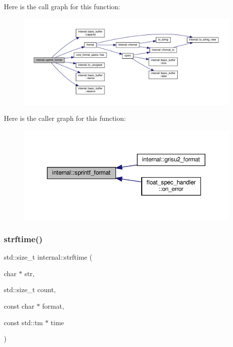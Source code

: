 Here is the call graph for this function\+:
\nopagebreak
\begin{figure}[H]
\begin{center}
\leavevmode
\includegraphics[width=350pt]{namespaceinternal_a13d861df4fe01615dc7cb28d77e839e4_cgraph}
\end{center}
\end{figure}
Here is the caller graph for this function\+:
\nopagebreak
\begin{figure}[H]
\begin{center}
\leavevmode
\includegraphics[width=343pt]{namespaceinternal_a13d861df4fe01615dc7cb28d77e839e4_icgraph}
\end{center}
\end{figure}
\mbox{\label{namespaceinternal_a1358037a310a2e6f3d05538df58ff412}} 
\subsubsection{\texorpdfstring{strftime()}{strftime()}\hspace{0.1cm}{\footnotesize\ttfamily [1/2]}}
{\footnotesize\ttfamily std\+::size\+\_\+t internal\+::strftime (\begin{DoxyParamCaption}\item[{char $\ast$}]{str,  }\item[{std\+::size\+\_\+t}]{count,  }\item[{const char $\ast$}]{format,  }\item[{const std\+::tm $\ast$}]{time }\end{DoxyParamCaption})\hspace{0.3cm}{\ttfamily [inline]}}



